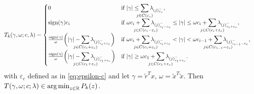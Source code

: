 \begin{theorem}
  \[
    T_k(\gamma, \omega; c, \lambda) =
    \begin{cases}
      0                                                                                                                                                   & \text{if } |\gamma| \leq \smashoperator{\sum_{j \in C({\varepsilon_c})}} \lambda_{(j)^-_{\varepsilon_c}},                                                                                                                                                        \\
      \sign(\gamma)c_i                                                                                                                                    & \text{if } \omega c_i + \smashoperator{\sum_{j \in C(c_i - {\varepsilon_c})}} \lambda_{(j)^-_{c_i - {\varepsilon_c}}} \leq |\gamma| \leq \omega c_i + \smashoperator{\sum_{j \in C(c_i + {\varepsilon_c})}} \lambda_{(j)^-_{c_i + {\varepsilon_c}}},             \\
      \frac{\sign(\gamma)}{\omega} \bigg( |\gamma| - \smashoperator{\sum_{j \in C(c_i + {\varepsilon_c})}} \lambda_{(j)^-_{c_i + {\varepsilon_c}}} \bigg) & \text{if } \omega c_i + \smashoperator{\sum_{j \in C(c_i + {\varepsilon_c})}} \lambda_{(j)^-_{c_i + {\varepsilon_c}}} < |\gamma| < \omega c_{i - 1} + \smashoperator{\sum_{j \in C(c_{i - 1} - {\varepsilon_c})}} \lambda_{(j)^-_{c_{i - 1} - {\varepsilon_c}}}, \\
      \frac{\sign(\gamma)}{\omega} \bigg( |\gamma| - \smashoperator{\sum_{j \in C(c_1 + {\varepsilon_c})}} \lambda_{(j)^-_{c_1 + {\varepsilon_c}}} \bigg) & \text{if } |\gamma| \geq \omega c_1 + \smashoperator{\sum_{j \in C(c_1 + {\varepsilon_c})}} \lambda_{(j)^-_{c_1 + {\varepsilon_c}}}.
    \end{cases}
  \]
  with \({\varepsilon_c}\) defined as in \eqref{eq:epsilon-c} and let
  \(\gamma = \tilde{r}^Tx\), \(\omega = \tilde{x}^T\tilde{x}\). Then
  \(T(\gamma, \omega; c; \lambda) \in \operatorname*{arg\,min}_{z \in \mathbb{R}} P_k(z)\).
\end{theorem}
